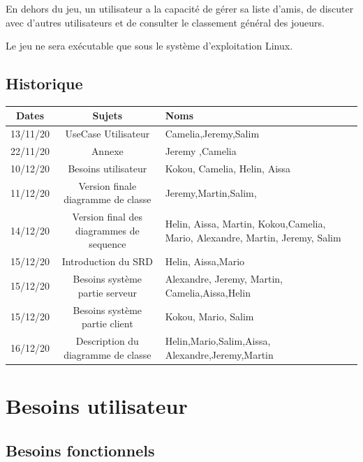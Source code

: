 \documentclass[a4paper,12pt]{article}
\begin{document}
En dehors du jeu, un utilisateur a la capacité de gérer sa liste d'amis, de discuter avec d'autres utilisateurs et de consulter le classement général des joueurs.

Le jeu ne sera exécutable que sous le système d'exploitation Linux.

\subsection{Historique}
\begin{tabularx}{15cm}{|c|c|X|}
	\hline
		Dates & Sujets & Noms \\
	\hline
		13/11/20 & UseCase Utilisateur & Camelia,Jeremy,Salim \\
	\hline
		22/11/20 & Annexe & Jeremy ,Camelia \\
	\hline
		10/12/20 & Besoins utilisateur & Kokou, Camelia, Helin, Aissa\\
	\hline
		11/12/20 & Version finale diagramme de classe  & Jeremy,Martin,Salim,\\
	\hline
		14/12/20 & Version final des diagrammes de sequence & Helin, Aissa, Martin, Kokou,Camelia, 
		Mario, Alexandre, Martin, Jeremy, Salim\\
	\hline
		15/12/20 & Introduction du SRD & Helin, Aissa,Mario\\
	\hline
		15/12/20 & Besoins système partie serveur & Alexandre, Jeremy, Martin, Camelia,Aissa,Helin\\
	\hline
		15/12/20 & Besoins système partie client & Kokou, Mario, Salim\\
	\hline
		16/12/20 & Description du diagramme de classe & Helin,Mario,Salim,Aissa,
		Alexandre,Jeremy,Martin\\
	\hline

\end{tabularx}

\section{Besoins utilisateur}

\subsection{Besoins fonctionnels}

\end{document}
